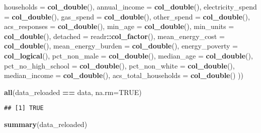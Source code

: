 \documentclass[]{article}
\newenvironment{Shaded}{\begin{snugshade}}{\end{snugshade}}
\newcommand{\DataTypeTok}[1]{\textcolor[rgb]{0.13,0.29,0.53}{#1}}
\newcommand{\KeywordTok}[1]{\textcolor[rgb]{0.13,0.29,0.53}{\textbf{#1}}}
\newcommand{\NormalTok}[1]{#1}
\newcommand{\OperatorTok}[1]{\textcolor[rgb]{0.81,0.36,0.00}{\textbf{#1}}}
\newcommand{\OtherTok}[1]{\textcolor[rgb]{0.56,0.35,0.01}{#1}}
\newcommand{\StringTok}[1]{\textcolor[rgb]{0.31,0.60,0.02}{#1}}
\begin{document}
\begin{Shaded}
\begin{Highlighting}[]
                            \DataTypeTok{households =} \KeywordTok{col_double}\NormalTok{(),}
                            \DataTypeTok{annual_income =} \KeywordTok{col_double}\NormalTok{(),}
                            \DataTypeTok{electricity_spend =} \KeywordTok{col_double}\NormalTok{(),}
                            \DataTypeTok{gas_spend =} \KeywordTok{col_double}\NormalTok{(),}
                            \DataTypeTok{other_spend =} \KeywordTok{col_double}\NormalTok{(),}
                            \DataTypeTok{acs_responses =} \KeywordTok{col_double}\NormalTok{(),}
                            \DataTypeTok{min_age =} \KeywordTok{col_double}\NormalTok{(),}
                            \DataTypeTok{min_units =} \KeywordTok{col_double}\NormalTok{(),}
                            \DataTypeTok{detached =}\NormalTok{ readr}\OperatorTok{::}\KeywordTok{col_factor}\NormalTok{(),}
                            \DataTypeTok{mean_energy_cost =} \KeywordTok{col_double}\NormalTok{(),}
                            \DataTypeTok{mean_energy_burden =} \KeywordTok{col_double}\NormalTok{(),}
                            \DataTypeTok{energy_poverty =} \KeywordTok{col_logical}\NormalTok{(),}
                            \DataTypeTok{pct_non_male =} \KeywordTok{col_double}\NormalTok{(), }
                            \DataTypeTok{median_age =} \KeywordTok{col_double}\NormalTok{(),}
                            \DataTypeTok{pct_no_high_school =} \KeywordTok{col_double}\NormalTok{(),}
                            \DataTypeTok{pct_non_white =} \KeywordTok{col_double}\NormalTok{(),}
                            \DataTypeTok{median_income =} \KeywordTok{col_double}\NormalTok{(),}
                            \DataTypeTok{acs_total_households =} \KeywordTok{col_double}\NormalTok{()}
\NormalTok{                            ))}

\KeywordTok{all}\NormalTok{(data_reloaded }\OperatorTok{==}\StringTok{ }\NormalTok{data, }\DataTypeTok{na.rm=}\OtherTok{TRUE}\NormalTok{)}
\end{Highlighting}
\end{Shaded}

\begin{verbatim}
## [1] TRUE
\end{verbatim}

\begin{Shaded}
\begin{Highlighting}[]
\KeywordTok{summary}\NormalTok{(data_reloaded)}
\end{Highlighting}
\end{Shaded}
\end{document}
